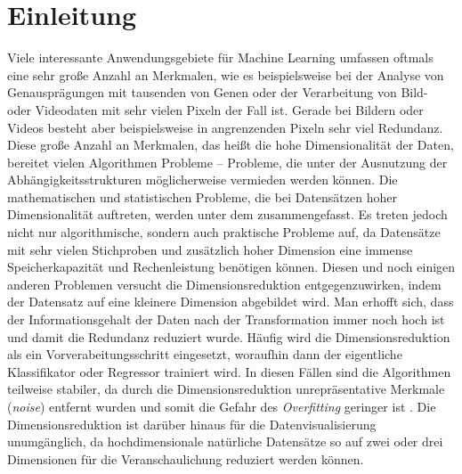 \chapter{Einleitung}
\label{ch:Enleitung}

Viele interessante Anwendungsgebiete für Machine Learning umfassen oftmals eine sehr große Anzahl
an Merkmalen, wie es beispielsweise bei der Analyse von Genausprägungen mit tausenden von Genen \parencite{Parmigiani.2003} oder der Verarbeitung von Bild- oder Videodaten mit sehr vielen Pixeln der
Fall ist. Gerade bei Bildern oder Videos besteht aber beispielsweise in angrenzenden Pixeln sehr
viel Redundanz. Diese große Anzahl an Merkmalen, das heißt die hohe Dimensionalität der Daten,
bereitet vielen Algorithmen Probleme -- Probleme, die unter der Ausnutzung der
Abhängigkeitsstrukturen möglicherweise vermieden werden können. Die mathematischen und
statistischen Probleme, die bei Datensätzen hoher Dimensionalität auftreten, werden unter dem
 \parencite{Aggarwal.2001} zusammengefasst. Es treten jedoch nicht nur algorithmische, sondern auch
praktische Probleme auf, da Datensätze mit sehr vielen Stichproben und zusätzlich hoher Dimension
eine immense Speicherkapazität und Rechenleistung benötigen können.
Diesen und noch einigen anderen Problemen versucht die Dimensionsreduktion entgegenzuwirken, indem
der Datensatz auf eine kleinere Dimension abgebildet wird. Man erhofft sich, dass der
Informationsgehalt der Daten nach der Transformation immer noch hoch ist und damit die Redundanz
reduziert wurde. Häufig wird die Dimensionsreduktion als ein Vorverabeitungsschritt eingesetzt,
woraufhin dann der eigentliche Klassifikator oder Regressor trainiert wird. In diesen Fällen sind
die Algorithmen teilweise stabiler, da durch die Dimensionsreduktion unrepräsentative Merkmale
(\textit{noise}) entfernt wurden und somit die Gefahr des \textit{Overfitting} geringer ist \parencites[siehe]{Plastria.2008}{MustafaAbdulSalam.2021}. Die Dimensionsreduktion ist darüber hinaus
für die Datenvisualisierung unumgänglich, da hochdimensionale natürliche Datensätze so auf zwei
oder drei Dimensionen für die Veranschaulichung reduziert werden können.


